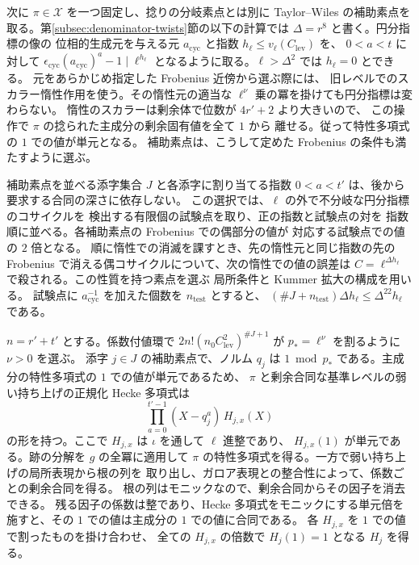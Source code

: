 次に \(\pi\in\mathcal X\) を一つ固定し、捻りの分岐素点とは別に
Taylor--Wiles の補助素点を取る。第\ref{subsec:denominator-twists}節の以下の計算では \(\Delta=r^8\) と書く。円分指標の像の
位相的生成元を与える元 \(a_{\mathrm{cyc}}\) と指数
\(h_\ell\le v_\ell(C_{\mathrm{lev}})\) を、
\(0<a<t\) に対して
\(\epsilon_{\mathrm{cyc}}(a_{\mathrm{cyc}})^a-1\mid\ell^{h_\ell}\)
となるように取る。\(\ell>\Delta^2\) では \(h_\ell=0\) とできる。
元をあらかじめ指定した Frobenius 近傍から選ぶ際には、
旧レベルでのスカラー惰性作用を使う。その惰性元の適当な \(\ell^\nu\) 乗の冪を掛けても円分指標は変わらない。
惰性のスカラーは剰余体で位数が \(4r'+2\) より大きいので、
この操作で \(\pi\) の捻られた主成分の剰余固有値を全て \(1\) から
離せる。従って特性多項式の \(1\) での値が単元となる。
補助素点は、こうして定めた Frobenius の条件も満たすように選ぶ。

補助素点を並べる添字集合 \(J\) と各添字に割り当てる指数
\(0<a<t'\) は、後から要求する合同の深さに依存しない。
この選択では、\(\ell\) の外で不分岐な円分指標のコサイクルを
検出する有限個の試験点を取り、正の指数と試験点の対を
指数順に並べる。各補助素点の Frobenius での偶部分の値が
対応する試験点での値の \(2\) 倍となる。
順に惰性での消滅を課すとき、先の惰性元と同じ指数の先の
Frobenius で消える偶コサイクルについて、次の惰性での値の誤差は
\(C=\ell^{\Delta h_\ell}\) で殺される。この性質を持つ素点を選ぶ
局所条件と Kummer 拡大の構成を用いる。
試験点に \(a_{\mathrm{cyc}}^{-1}\) を加えた個数を \(n_{\mathrm{test}}\)
とすると、
\((\#J+n_{\mathrm{test}})\Delta h_\ell\le\Delta^{22}h_\ell\) である。

\(n=r'+t'\) とする。係数付値環で \(2n!(n_0C_{\mathrm{lev}}^2)^{\#J+1}\) が
\(p_\ast=\ell^\nu\) を割るように \(\nu>0\) を選ぶ。
添字 \(j\in J\) の補助素点で、ノルム \(q_j\) は \(1\bmod p_\ast\)
である。主成分の特性多項式の \(1\) での値が単元であるため、
\(\pi\) と剰余合同な基準レベルの弱い持ち上げの正規化 Hecke 多項式は
\[
  \prod_{a=0}^{t'-1}(X-q_j^a)\,H_{j,x}(X)
\]
の形を持つ。ここで \(H_{j,x}\) は \(\iota\) を通して \(\ell\) 進整であり、
\(H_{j,x}(1)\) が単元である。跡の分解を \(g\) の全冪に適用して
\(\pi\) の特性多項式を得る。一方で弱い持ち上げの局所表現から根の列を
取り出し、ガロア表現との整合性によって、係数ごとの剰余合同を得る。
根の列はモニックなので、剰余合同からその因子を消去できる。
残る因子の係数は整であり、Hecke 多項式をモニックにする単元倍を
施すと、その \(1\) での値は主成分の \(1\) での値に合同である。
各 \(H_{j,x}\) を \(1\) での値で割ったものを掛け合わせ、
全ての \(H_{j,x}\) の倍数で \(H_j(1)=1\) となる \(H_j\) を得る。

